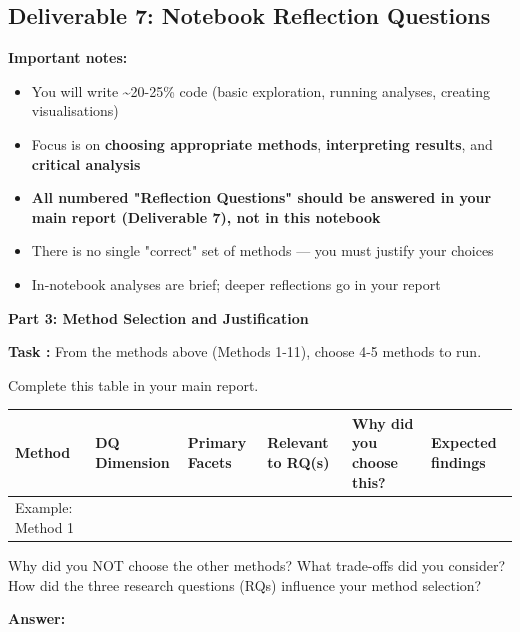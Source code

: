 \subsection{Deliverable 7: Notebook Reflection Questions}
\label{sec:deliverable7}

\textbf{Important notes:}
\begin{itemize}
  \item You will write \textasciitilde20-25\% code (basic exploration, running analyses, creating visualisations)
  \item Focus is on \textbf{choosing appropriate methods}, \textbf{interpreting results}, and \textbf{critical analysis}
  \item \textbf{All numbered "Reflection Questions" should be answered in your main report (Deliverable 7), not in this notebook}
  \item There is no single "correct" set of methods --- you must justify your choices
  \item In-notebook analyses are brief; deeper reflections go in your report
\end{itemize}

\textbf{Part 3: Method Selection and Justification}

\textbf{Task :} From the methods above (Methods 1-11), choose 4-5 methods to run.

Complete this table in your main report.

\begin{table}[H]
\centering
\small
\label{tab:d7_method_selection}
\begin{tabularx}{\textwidth}{
>{\raggedright\arraybackslash}p{}
>{\raggedright\arraybackslash}p{}
>{\raggedright\arraybackslash}p{}
>{\raggedright\arraybackslash}p{}
>{\raggedright\arraybackslash}X
>{\raggedright\arraybackslash}p{}
}
\toprule
Method & DQ Dimension & Primary Facets & Relevant to RQ(s) & Why did you choose this? & Expected findings \\
\midrule
Example: Method 1 &  &  &  &  &  \\
\bottomrule
\end{tabularx}
\end{table}

Why did you NOT choose the other methods? What trade-offs did you consider? How did the three research questions (RQs) influence your method selection?

\textbf{Answer:}

